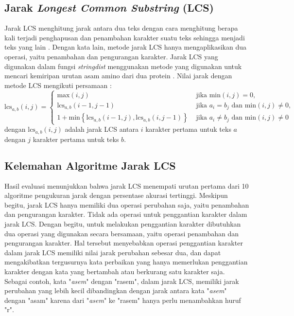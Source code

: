 \subsection{Jarak \textit{Longest Common Substring} (LCS)}

Jarak LCS menghitung jarak antara dua teks dengan cara menghitung berapa kali terjadi penghapusan dan penambahan karakter suatu teks sehingga menjadi teks yang lain \parencite{van2014stringdist}. Dengan kata lain, metode jarak LCS hanya mengaplikasikan dua operasi, yaitu penambahan dan pengurangan karakter. Jarak LCS yang digunakan dalam fungsi \textit{stringdist} menggunakan metode yang digunakan untuk mencari kemiripan urutan asam amino dari dua protein \parencite{needleman1970general}. Nilai jarak dengan metode LCS mengikuti persamaan \parencite{van2014stringdist}:
\begin{equation} \label{eq:lcs}
	\text{lcs}_{a,b}(i,j)=\begin{cases}
		\text{max}(i,j) & \text{ jika min} (i,j)=0, \\ 
		\text{lcs}_{a,b}(i-1,j-1) & \text{ jika } a_{i}=b_{j} \text{ dan min} (i,j)\neq 0, \\
		1 + \text{min}\left \{ \text{lcs}_{a,b}(i-1,j), \text{lcs}_{a,b}(i,j-1) \right \} & \text{ jika } a_{i}\neq b_{j} \text{ dan min} (i,j)\neq 0
	\end{cases}
\end{equation}
\noindent
dengan $\text{lcs}_{a,b}(i,j)$ adalah jarak LCS antara $i$ karakter pertama untuk teks $a$ dengan $j$ karakter pertama untuk teks $b$.

\subsection{Kelemahan Algoritme Jarak LCS}

Hasil evaluasi menunjukkan bahwa jarak LCS menempati urutan pertama dari 10 algoritme pengukuran jarak dengan persentase akurasi tertinggi. Meskipun begitu, jarak LCS hanya memiliki dua operasi perubahan saja, yaitu penambahan dan pengurangan karakter. Tidak ada operasi untuk penggantian karakter dalam jarak LCS. Dengan begitu, untuk melakukan penggantian karakter dibutuhkan dua operasi yang digunakan secara bersamaan, yaitu operasi penambahan dan pengurangan karakter. Hal tersebut menyebabkan operasi penggantian karakter dalam jarak LCS memiliki nilai jarak perubahan sebesar dua, dan dapat mengakibatkan tergusurnya kata perbaikan yang hanya memerlukan penggantian karakter dengan kata yang bertambah atau berkurang satu karakter saja. Sebagai contoh, kata "\textit{asem}" dengan "rasem", dalam jarak LCS, memiliki jarak perubahan yang lebih kecil dibandingkan dengan jarak antara kata "\textit{asem}" dengan "asam" karena dari "\textit{asem}" ke "rasem" hanya perlu menambahkan huruf "r".

